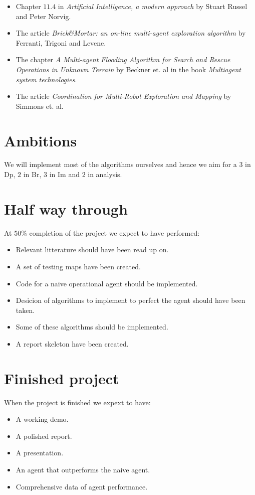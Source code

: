 \documentclass{article}
\begin{document}
\begin{itemize}
\item Chapter $11.4$ in \textit{Artificial Intelligence, a modern approach} by Stuart Russel and Peter Norvig.
\item The article \textit{Brick\&Mortar: an on-line multi-agent exploration algorithm} by Ferranti, Trigoni and Levene.
\item The chapter \textit{A Multi-agent Flooding Algorithm for Search and Rescue Operations in Unknown Terrain} by Beckner et. al in the book \textit{Multiagent system technologies}.
\item The article \textit{Coordination for Multi-Robot Exploration and Mapping} by Simmons et. al.
\end{itemize}

\section{Ambitions}
We will implement most of the algorithms ourselves and hence we aim for a $3$ in Dp, $2$ in Br, $3$ in Im and $2$ in analysis.

\section{Half way through}
At 50\% completion of the project we expect to have performed:

\begin{itemize}
\item Relevant litterature should have been read up on.
\item A set of testing maps have been created.
\item Code for a naive operational agent should be implemented.
\item Desicion of algorithms to implement to perfect the agent should have been taken.
\item Some of these algorithms should be implemented.
\item A report skeleton have been created.
\end{itemize}

\section{Finished project}
When the project is finished we expext to have:

\begin{itemize}
\item A working demo.
\item A polished report.
\item A presentation.
\item An agent that outperforms the naive agent.
\item Comprehensive data of agent performance.
\end{itemize}
\end{document}
